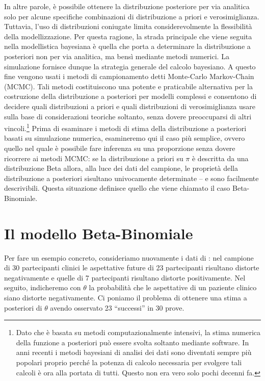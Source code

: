 \documentclass[
  10pt,
  italian,
  a4paper,
  extrafontsizes,onecolumn,openright
  ]{memoir}
\theoremstyle{definition}
\theoremstyle{definition}
\theoremstyle{definition}
\theoremstyle{definition}
\theoremstyle{remark}
\begin{document}
In altre parole, è possibile ottenere la distribuzione posteriore per via analitica solo per alcune specifiche combinazioni di distribuzione a priori e verosimiglianza. Tuttavia, l'uso di distribuzioni coniugate limita considerevolmente la flessibilità della modellizzazione. Per questa ragione, la strada principale che viene seguita nella modellistica bayesiana è quella che porta a determinare la distribuzione a posteriori non per via analitica, ma bensì mediante metodi numerici. La simulazione fornisce dunque la strategia generale del calcolo bayesiano. A questo fine vengono usati i metodi di campionamento detti Monte-Carlo Markov-Chain (MCMC). Tali metodi costituiscono una potente e praticabile alternativa per la costruzione della distribuzione a posteriori per modelli complessi e consentono di decidere quali distribuzioni a priori e quali distribuzioni di verosimiglianza usare sulla base di considerazioni teoriche soltanto, senza dovere preoccuparsi di altri vincoli.\footnote{Dato che è basata su metodi computazionalmente intensivi, la stima numerica della funzione a posteriori può essere svolta soltanto mediante software. In anni recenti i metodi bayesiani di analisi dei dati sono diventati sempre più popolari proprio perché la potenza di calcolo necessaria per svolgere tali calcoli è ora alla portata di tutti. Questo non era vero solo pochi decenni fa.} Prima di esaminare i metodi di stima della distribuzione a posteriori basati su simulazione numerica, esamineremo qui il caso più semplice, ovvero quello nel quale è possibile fare inferenza su una proporzione senza dovere ricorrere ai metodi MCMC: se la distribuzione a priori su \(\pi\) è descritta da una distribuzione Beta allora, alla luce dei dati del campione, le proprietà della distribuzione a posteriori sisultano univocamente determinate -- e sono facilmente descrivibili. Questa situazione definisce quello che viene chiamato il caso Beta-Binomiale.

\hypertarget{chapter-distr-priori-coniugate}{%
\section{Il modello Beta-Binomiale}\label{chapter-distr-priori-coniugate}}

Per fare un esempio concreto, consideriamo nuovamente i dati di \textcite{zetschefuture2019}: nel campione di 30 partecipanti clinici le aspettative future di 23 partecipanti risultano distorte negativamente e quelle di 7 partecipanti risultano distorte positivamente. Nel seguito, indicheremo con \(\theta\) la probabilità che le aspettative di un paziente clinico siano distorte negativamente. Ci poniamo il problema di ottenere una stima a posteriori di \(\theta\) avendo osservato 23 ``successi'' in 30 prove.
\end{document}
